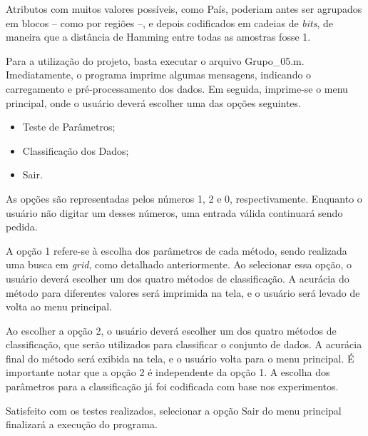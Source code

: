 \documentclass[10pt, conference, compsocconf]{IEEEtran}
\begin{document}
Atributos com muitos valores possíveis, como País, poderiam antes ser agrupados em blocos -- como por regiões --, e depois codificados em cadeias de \textit{bits}, de maneira que a distância de Hamming entre todas as amostras fosse 1.

\begin{appendix}

Para a utilização do projeto, basta executar o arquivo Grupo\_05.m. Imediatamente, o programa imprime algumas mensagens, indicando o carregamento e pré-processamento dos dados. Em seguida, imprime-se o menu principal, onde o usuário deverá escolher uma das opções seguintes.
\begin{itemize}
\item Teste de Parâmetros;
\item Classificação dos Dados;
\item Sair.
\end{itemize}

As opções são representadas pelos números 1, 2 e 0, respectivamente. Enquanto o usuário não digitar um desses números, uma entrada válida continuará sendo pedida.

A opção 1 refere-se à escolha dos parâmetros de cada método, sendo realizada uma busca em \textit{grid}, como detalhado anteriormente. Ao selecionar essa opção, o usuário deverá escolher um dos quatro métodos de classificação. A acurácia do método para diferentes valores será imprimida na tela, e o usuário será levado de volta ao menu principal.

Ao escolher a opção 2, o usuário deverá escolher um dos quatro métodos de classificação, que serão utilizados para classificar o conjunto de dados. A acurácia final do método será exibida na tela, e o usuário volta para o menu principal. É importante notar que a opção 2 é independente da opção 1. A escolha dos parâmetros para a classificação já foi codificada com base nos experimentos.

Satisfeito com os testes realizados, selecionar a opção Sair do menu principal finalizará a execução do programa.

\end{appendix}

\end{document}
